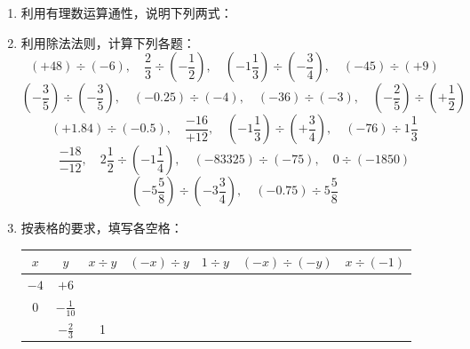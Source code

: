 \begin{enumerate}
\begin{enumerate}
\end{enumerate}

\item 利用有理数运算通性，说明下列两式：
\begin{enumerate}
\end{enumerate}

\item 利用除法法则，计算下列各题：
\[(+48)\div (-6),\quad \frac{2}{3}\div \left(-\frac{1}{2}\right),\quad \left(-1 \frac{1}{3}\right)\div\left(-\frac{3}{4}\right), \quad (-45)\div (+9)\]
\[\left(-\frac{3}{5}\right) \div\left(-\frac{3}{5}\right), \quad (-0.25) \div(-4), \quad 
(-36) \div(-3), \quad\left(-\frac{2}{5}\right) \div\left(+\frac{1}{2}\right)\]
\[(+1.84) \div(-0.5), \quad \frac{-16}{+12},\quad 
\left(-1 \frac{1}{3}\right)\div\left(+\frac{3}{4}\right), \quad(-76) \div 1 \frac{1}{3}\]
\[\frac{-18}{-12}, \quad 2 \frac{1}{2}\div \left(-1\frac{1}{4}\right),\quad (-83325) \div(-75), \quad 0 \div(-1850)\]
\[\left(-5 \frac{5}{8}\right)\div \left(-3 \frac{3}{4}\right), \quad(-0.75) \div 5 \frac{5}{8}\]

\item 按表格的要求，填写各空格：
\begin{center}
     \renewcommand{\arraystretch}{1.8}
    \begin{tabular}{c|c|c|c|c|c|c}
       
    \hline
    $x$  &  $y$  &  $x\div y$  &  $(-x)\div y$  &     $1\div y$  &  $(-x)\div(-y)$ &$x\div(-1)$\\
    \hline
 $-4$ & $+6$  &&&&&\\
 $0$ & $-\frac{1}{10}$  &&&&&\\
  & $-\frac{2}{3}$  &1&&&&\\
    \hline
    \end{tabular}    
    \end{center}


\end{enumerate}
